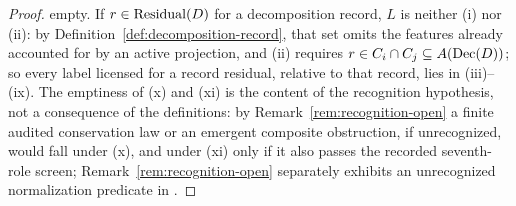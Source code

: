 \begin{proof}
empty. If \(r\in\operatorname{Residual}\!\left(D\right)\) for a decomposition record, \(L\) is neither (i)
nor (ii): by Definition~\ref{def:decomposition-record}, that set omits the
features already accounted for by an active projection, and (ii) requires
\(r\in C_i\cap C_j\subseteq A(\operatorname{Dec}\!\left(D\right))\); so every label licensed for a record
residual, relative to that record, lies in (iii)--(ix). The
emptiness of (x) and (xi) is the content of the recognition hypothesis, not a
consequence of the \FATCD{} definitions: by Remark~\ref{rem:recognition-open}
a finite audited conservation law or an emergent composite obstruction, if
unrecognized, would fall under (x), and under (xi) only if it also passes the recorded
seventh-role screen; Remark~\ref{rem:recognition-open} separately
exhibits an unrecognized normalization predicate in \FATCD{}.
\end{proof}

